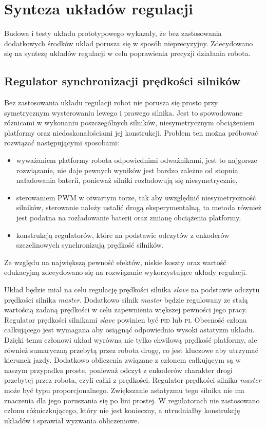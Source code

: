 \documentclass[11pt]{article}
\begin{document}
\section{Synteza układów regulacji}
Budowa i testy układu prototypowego wykazały, że bez zastosowania dodatkowych środków układ porusza się w sposób nieprecyzyjny.
Zdecydowano się na syntezę układów regulacji w celu poprawienia precyzji działania robota.
\subsection{Regulator synchronizacji prędkości silników}
Bez zastosowania układu regulacji robot nie porusza się prosto przy symetrycznym wysterowaniu lewego i prawego silnika.
Jest to spowodowane różnicami w wykonaniu poszczególnych silników, niesymetrycznym obciążeniem platformy oraz niedoskonałościami jej konstrukcji.
Problem ten można próbować rozwiązać następującymi sposobami:
\begin{itemize}
	\item wyważaniem platformy robota odpowiednimi odważnikami, jest to najgorsze rozwiązanie, nie daje pewnych wyników jest bardzo zależne od stopnia naładowania baterii, ponieważ silniki rozładowują się niesymetrycznie,
	\item sterowaniem PWM w otwartym torze, tak aby uwzględnić niesymetryczność silników, sterowanie należy ustalić drogą eksperymentalną, ta metoda również jest podatna na rozładowanie baterii oraz zmianę obciążenia platformy,
	\item konstrukcją regulatorów, które na podstawie odczytów z enkoderów szczelinowych synchronizują prędkość silników.
\end{itemize}

Ze względu na największą pewność efektów, niskie koszty oraz wartość edukacyjną zdecydowano się na rozwiązanie wykorzystujące układy regulacji.


Układ będzie miał na celu regulację prędkości silnika \textit{slave} na podstawie odczytu prędkości silnika \textit{master}. Dodatkowo silnik \textit{master} będzie regulowany ze stałą wartością zadaną prędkości w celu zapewnienia większej pewności jego pracy.
Regulator prędkości silnikami \textit{slave} powinien być \textsc{pid} lub \textsc{pi}.
Obecność członu całkującego jest wymagana aby osiągnąć odpowiednio wysoki astatyzm układu.
Dzięki temu członowi układ wyrówna nie tylko chwilową prędkość platformy, ale również sumaryczną przebytą przez robota drogę, co jest kluczowe aby utrzymać kierunek jazdy.
Dodatkowo obliczenia związane z członem całkującym są w naszym przypadku proste, ponieważ odczyt z enkoderów charakter drogi przebytej przez robota, czyli całki z prędkości.
Regulator prędkości silnika \textit{master} może być typu proporcjonalnego.
Zwiększanie astatyzmu tego silnika nie ma znaczenia dla jego poruszania się po lini prostej.
W regulatorach nie zastosowano członu różniczkującego, który nie jest konieczny, a utrudniałby konstrukcję układów i sprawiał wyzwania obliczeniowe.
\end{document}
